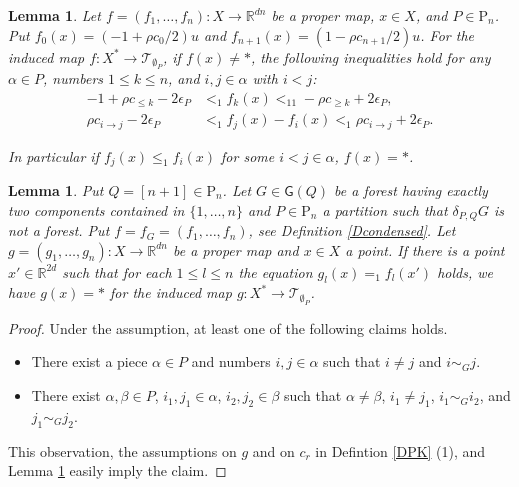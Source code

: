 \documentclass[reqno]{amsart}
\theoremstyle{definition}
\theoremstyle{plain}
\newtheorem{lem}[defi]{Lemma}
\newcommand{\eps}{\epsilon}
\newcommand{\TT}{\mathcal{T}} %
\newcommand{\GG}{\mathsf{G}}%
\newcommand{\RR}{\mathbb{R}}
\newcommand{\PP}{\mathrm{P}} %
\begin{document}
\begin{lem}\label{Lcondensed_collapse0}
Let $f=(f_1,\dots, f_n):X\to \RR^{dn}$ be a proper map, $x\in X$, and $P\in \PP_n$. Put $f_0(x)=(-1+\rho c_0/2)u$ and $f_{n+1}(x)=(1-\rho c_{n+1}/2)u$. For the induced map $f:X^*\to \TT_{\emptyset_P}$, if $f(x)\not=*$,  the following inequalities hold for any $\alpha\in P$,  numbers $1\leq k\leq n$, and $i, j\in \alpha$ with $i<j$:
\[
\begin{split}
-1+\rho c_{\leq k}-2\eps_P&<_1f_k(x)<_11-\rho c_{\geq k}+2\eps_P, \\
\rho c_{i\to j}-2\eps_P&<_1f_j(x)-f_i(x)<_1\rho c_{i\to j}+2\eps_P.
\end{split}
\]

In particular if $f_{j}(x)\leq_1 f_{i}(x)$ for some $i<j \in \alpha$, $f(x)=*$.\hfill\qedsymbol
\end{lem}
\begin{lem}\label{Lcondensed_collapse1}
Put $Q=[n+1]\in \PP_n$. Let $G\in\GG(Q)$ be a forest having exactly two components contained in $\{1,\dots,n\}$ and $P\in \PP_n$  a partition such that $\delta_{P,Q}G$ is not a forest. Put $f=f_G=(f_1,\dots, f_n)$, see Definition \ref{Dcondensed}. Let $g=(g_1,\dots, g_n):X\to \RR^{dn}$ be a proper map and $x\in X$ a point. If there is a point $x'\in \RR^{2d}$ such that for each $1\leq l\leq n$ the equation $g_l(x)=_1f_l(x')$ holds, we have $g(x)=*$ for the induced map $g:X^*\to \TT_{\emptyset_P}$.%
\end{lem}
\begin{proof}
Under the assumption, at least one of the following claims holds.
\begin{itemize}
\item There exist a piece $\alpha\in P$ and numbers $i,j\in \alpha $ such that $i\not=j$ and  $i\sim_Gj$.
\item There exist   $\alpha,\beta\in P$, $i_1,j_1\in \alpha$, $i_2,j_2\in \beta$ such that $\alpha\not=\beta$, $i_1\not=j_1$, $i_1\sim_Gi_2$, and $j_1\sim_Gj_2$.
\end{itemize}
This observation, the assumptions on $g$ and on $c_r$ in Defintion \ref{DPK} (1), and Lemma \ref{Lcondensed_collapse0} easily imply the claim.
\end{proof}
\end{document}
